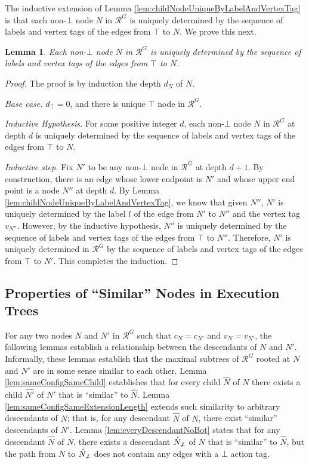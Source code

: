 \documentclass[11pt]{article}
\numberwithin{theorem}{section}
\newtheorem{lemma}[theorem]{Lemma}
\begin{document}
The inductive extension of Lemma \ref{lem:childNodeUniqueByLabelAndVertexTag} is that each non-$\bot$ node $N$ in $\mathcal{R}^G$ is uniquely determined by the sequence of labels and vertex tags of the edges from $\top$ to $N$. We prove this next.

\begin{lemma}\label{lem:LabelsAndVertexAgsDenoteUniqueNode}
Each non-$\bot$ node $N$ in $\mathcal{R}^G$ is uniquely determined by the sequence of labels and vertex tags of the edges from $\top$ to $N$.
\end{lemma}
\begin{proof}
The proof is by induction the depth $d_N$ of $N$.

\emph{Base case.} $d_\top = 0$, and there is unique $\top$ node in $\mathcal{R}^G$.

\emph{Inductive Hypothesis.} For some positive integer $d$, each non-$\bot$ node $N$ in $\mathcal{R}^G$ at depth $d$ is uniquely determined by the sequence of labels and vertex tags of the edges from $\top$ to $N$.

\emph{Inductive step.} Fix $N'$ to be any non-$\bot$ node in $\mathcal{R}^G$ at depth $d+1$. By construction, there is an edge whose lower endpoint is $N'$ and whose upper end point is a node $N''$ at depth $d$. By Lemma \ref{lem:childNodeUniqueByLabelAndVertexTag}, we know that given $N''$, $N'$ is uniquely determined by the label $l$ of the edge from $N'$ to $N''$ and the vertex tag $v_{N''}$. However, by the inductive hypothesis, $N''$ is uniquely determined by the sequence of labels and vertex tags of the edges from $\top$ to $N''$. Therefore, $N'$ is uniquely determined in $\mathcal{R}^G$ by the sequence of labels and vertex tags of the edges from $\top$ to $N'$. This completes the induction.
\end{proof}





\subsection{Properties of ``Similar'' Nodes in Execution Trees}
\label{subsec:taggedTreeProps}

For any two nodes $N$ and $N'$ in $\mathcal{R}^{G}$ such that $c_N =
c_{N'}$ and $v_N = v_{N'}$, the following lemmas establish a
relationship between the descendants of $N$ and $N'$. Informally,
these lemmas establish that the maximal subtrees of $\mathcal{R}^G$
rooted at $N$ and $N'$ are in some sense similar to each other.
Lemma \ref{lem:sameConfigSameChild} establishes that for every child
$\hat{N}$ of $N$ there exists a child $\hat{N'}$ of $N'$ that is
``similar'' to $\hat{N}$. Lemma \ref{lem:sameConfigSameExtensionLength}
extends such similarity to arbitrary descendants of $N$; that is,
for any descendant $\hat{N}$ of $N$, there exist ``similar'' descendants
of $N'$. Lemma \ref{lem:everyDescendantNoBot} states that for any descendant $\hat{N}$ of $N$, there exists a descendant $\hat{N}_{\not\bot}$ of $N$ that is ``similar'' to $\hat{N}$, but the path from $N$ to $\hat{N}_{\not\bot}$ does not contain any edges with a $\bot$ action tag.
\end{document}
